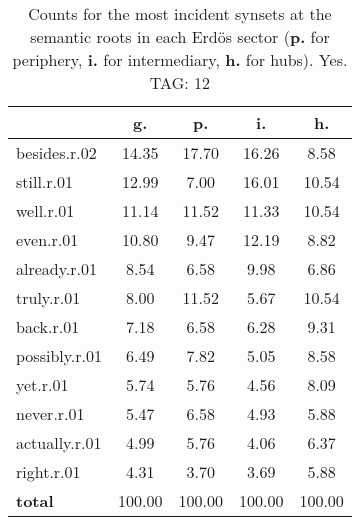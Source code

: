\begin{table}[h!]
\begin{center}
\begin{tabular}{| l || c | c | c | c |}\hline
 & {\bf g.} & {\bf p.} & {\bf i.} & {\bf h.} \\\hline\hline
besides.r.02 & 14.35  & 17.70  & 16.26  & 8.58 \\\hline
still.r.01 & 12.99  & 7.00  & 16.01  & 10.54 \\\hline
well.r.01 & 11.14  & 11.52  & 11.33  & 10.54 \\\hline
even.r.01 & 10.80  & 9.47  & 12.19  & 8.82 \\\hline
already.r.01 & 8.54  & 6.58  & 9.98  & 6.86 \\\hline
truly.r.01 & 8.00  & 11.52  & 5.67  & 10.54 \\\hline
back.r.01 & 7.18  & 6.58  & 6.28  & 9.31 \\\hline
possibly.r.01 & 6.49  & 7.82  & 5.05  & 8.58 \\\hline
yet.r.01 & 5.74  & 5.76  & 4.56  & 8.09 \\\hline
never.r.01 & 5.47  & 6.58  & 4.93  & 5.88 \\\hline
actually.r.01 & 4.99  & 5.76  & 4.06  & 6.37 \\\hline
right.r.01 & 4.31  & 3.70  & 3.69  & 5.88 \\\hline\hline
{{\bf total}} & 100.00  & 100.00  & 100.00  & 100.00 \\\hline
\end{tabular}
\caption{Counts for the most incident synsets at the semantic roots in each Erd\"os sector ({\bf p.} for periphery, {\bf i.} for intermediary, {\bf h.} for hubs). Yes. TAG: 12}
\end{center}
\end{table}